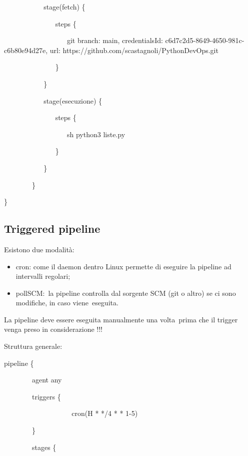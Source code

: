\documentclass[
]{article}
\providecommand{\tightlist}{%
  \setlength{\itemsep}{0pt}\setlength{\parskip}{0pt}}
\begin{document}
{~ ~ ~~~~~~~~stage(\textquotesingle fetch\textquotesingle) \{}

{~ ~ ~ ~ ~~~~~~~~steps \{}

{~ ~ ~ ~ ~ ~ ~~~~~~~~git branch: \textquotesingle main\textquotesingle,
credentialsId:
\textquotesingle c6d7c2d5-8649-4650-981c-c6b80e94d27e\textquotesingle,
url:
\textquotesingle https://github.com/scastagnoli/PythonDevOps.git\textquotesingle{}}

{~ ~ ~ ~ ~~~~~~~~\}}

{~ ~ ~~~~~~~~\}}

{~ ~ ~~~~~~~~stage(\textquotesingle esecuzione\textquotesingle) \{}

{~ ~ ~ ~ ~~~~~~~~steps \{}

{~ ~ ~ ~ ~ ~ ~~~~~~~~sh \textquotesingle python3
liste.py\textquotesingle{}}

{~ ~ ~ ~ ~~~~~~~~\}}

{~ ~ ~~~~~~~~\}}

{~~~~~~~~\}}

{\}}

\subsection{\texorpdfstring{{Triggered
pipeline}}{Triggered pipeline}}\label{h.bqv6f35zftl4}

{Esistono due modalità:}

\begin{itemize}
\tightlist
\item
  {cron}{: come il daemon dentro Linux permette di eseguire la pipeline
  ad intervalli regolari;}
\item
  {pollSCM}{:}{~la pipeline controlla dal sorgente SCM (git o altro) se
  ci sono modifiche, in caso }{viene}{~eseguita.}
\end{itemize}

{}

{La pipeline deve essere }{eseguita manualmente una volta}{~prima che il
trigger venga preso in considerazione !!!}

{}

{Struttura generale:}

{pipeline \{}

{~~~~~~~~agent any}

{~~~~~~~~triggers \{}

{~ ~ ~~~~~~~~~~~~~~~~cron(\textquotesingle H * */4 * *
1-5\textquotesingle)}

{~~~~~~~~\}}

{~~~~~~~~stages \{}
\end{document}
